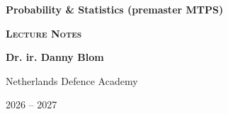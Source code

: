\begin{titlepage}
    \begin{center}
        {\Huge\bfseries Probability \& Statistics (premaster MTPS)\par}
        \vspace{1.5cm}

        {\Large\scshape\bfseries Lecture Notes\par}
        \vspace{15cm}

        {\Large \bfseries Dr. ir. Danny Blom\par}
        {\Large Netherlands Defence Academy\par}
        
        \vfill

        {\large 2026 -- 2027\par}
    \end{center}
\end{titlepage}